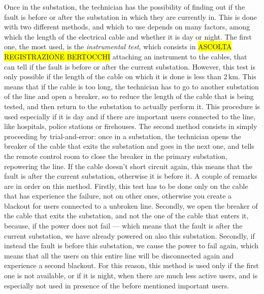 Once in the substation, the technician has the possibility of finding out if the fault is before or after the substation in which they are currently in. This is done with two different methods, and which to use depends on many factors, among which the length of the electrical cable and whether it is day or night. The first one, the most used, is the \emph{instrumental test}, which consists in \colorbox{yellow}{ASCOLTA REGISTRAZIONE BERTOCCHI} attaching an instrument to the cables, that can tell if the fault is before or after the current substation. However, this test is only possible if the length of the cable on which it is done is less than $2 \, \mathrm{km}$. This means that if the cable is too long, the technician has to go to another substation of the line and open a breaker, so to reduce the length of the cable that is being tested, and then return to the substation to actually perform it. This procedure is used especially if it is day and if there are important users connected to the line, like hospitals, police stations or firehouses. The second method consists in simply proceeding by trial-and-error: once in a substation, the technician opens the breaker of the cable that exits the substation and goes in the next one, and tells the remote control room to close the breaker in the primary substation, repowering the line. If the cable doesn't short circuit again, this means that the fault is after the current substation, otherwise it is before it. A couple of remarks are in order on this method. Firstly, this test has to be done only on the cable that has experience the failure, not on other ones, otherwise you create a blackout for users connected to a unbroken line. Secondly, we open the breaker of the cable that exits the substation, and not the one of the cable that enters it, because, if the power does not fail --- which means that the fault is after the current substation, we have already powered on also this substation.
Secondly, if instead the fault is before this substation, we cause the power to fail again, which means that all the users on this entire line will be disconnected again and experience a second blackout. For this reason, this method is used only if the first one is not available, or if it is night, when there are much less active users, and is especially not used in presence of the before mentioned important users.

